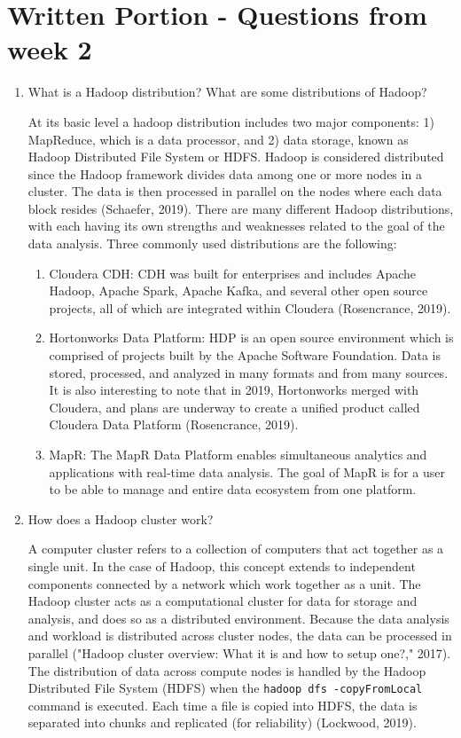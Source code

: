 \documentclass[]{article}
\newcommand{\code}[1]{\colorbox{light-gray}{\texttt{#1}}}
\begin{document}
\section{Written Portion - Questions from week 2}
\begin{enumerate}
	\item What is a Hadoop distribution? What are some distributions of Hadoop?
	
	At its basic level a hadoop distribution includes two major components: 1) MapReduce, which is a data processor, and 2) data storage, known as Hadoop Distributed File System or HDFS.  Hadoop is considered distributed since the Hadoop framework divides data among one or more nodes in a cluster.  The data is then processed in parallel on the nodes where each data block resides (Schaefer, 2019).    
	There are many different Hadoop distributions, with each having its own strengths and weaknesses related to the goal of the data analysis.  Three commonly used distributions are the following:
\begin{enumerate}
	\item Cloudera CDH: CDH was built for enterprises and includes Apache Hadoop, Apache Spark, Apache Kafka, and several other open source projects, all of which are integrated within Cloudera (Rosencrance, 2019).
	\item Hortonworks Data Platform: HDP is an open source environment which is comprised of projects built by the Apache Software Foundation.  Data is stored, processed, and analyzed in many formats and from many sources.   It is also interesting to note that in 2019, Hortonworks merged with Cloudera, and plans are underway to create a unified product called Cloudera Data Platform (Rosencrance, 2019).
	\item MapR: The MapR Data Platform enables simultaneous analytics and applications with real-time data analysis.  The goal of MapR is for a user to be able to manage and entire data ecosystem from one platform.  
	
\end{enumerate}
	\item How does a Hadoop cluster work?
	
	A computer cluster refers to a collection of computers that act together as a single unit.  In the case of Hadoop, this concept extends to independent components connected by a network which work together as a unit.  The Hadoop cluster acts as a computational cluster for data for storage and analysis, and does so as a distributed environment.  Because the data analysis and workload is distributed across cluster nodes, the data can be processed in parallel ("Hadoop cluster overview: What it is and how to setup one?," 2017).  The distribution of data across compute nodes is handled by the Hadoop Distributed File System (HDFS) when the \code{hadoop dfs -copyFromLocal} command is executed.  Each time a file is copied into HDFS, the data is separated into chunks and replicated (for reliability) (Lockwood, 2019).
	

\end{enumerate}
\end{document}
